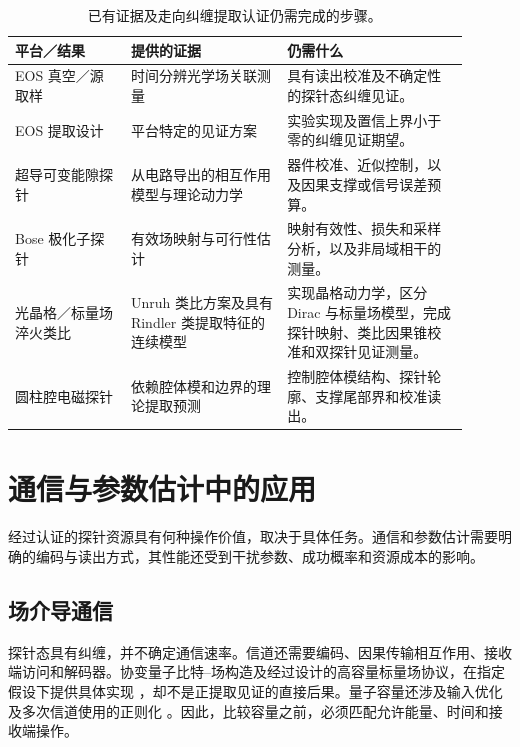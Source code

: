 \documentclass[UTF8,11pt,a4paper,fontset=none]{ctexart}
\begin{document}
\begin{table}[htbp]
\centering\small
\caption{已有证据及走向纠缠提取认证仍需完成的步骤。}
\label{tab:platform-evidence}
\begin{tabular}{p{0.23\linewidth}p{0.31\linewidth}p{0.36\linewidth}}
\toprule
平台／结果 & 提供的证据 & 仍需什么\\
\midrule
EOS 真空／源取样 \cite{Herter2026VacuumSource} & 时间分辨光学场关联测量 & 具有读出校准及不确定性的探针态纠缠见证。\\
EOS 提取设计 \cite{Lindel2024} & 平台特定的见证方案 & 实验实现及置信上界小于零的纠缠见证期望。\\
超导可变能隙探针 \cite{TeixidoBonfill2026} & 从电路导出的相互作用模型与理论动力学 & 器件校准、近似控制，以及因果支撑或信号误差预算。\\
Bose 极化子探针 \cite{PercheGozzini2026} & 有效场映射与可行性估计 & 映射有效性、损失和采样分析，以及非局域相干的测量。\\
光晶格／标量场淬火类比 \cite{RodriguezLaguna2017,KosiorLewensteinCeli2018,Louko2018RindlerQuench,LopezRavenMannLouko2025} & Unruh 类比方案及具有 Rindler 类提取特征的连续模型 & 实现晶格动力学，区分 Dirac 与标量场模型，完成探针映射、类比因果锥校准和双探针见证测量。\\
圆柱腔电磁探针 \cite{StrohleMomcilovic2026} & 依赖腔体模和边界的理论提取预测 & 控制腔体模结构、探针轮廓、支撑尾部界和校准读出。\\
\bottomrule
\end{tabular}
\end{table}

\section{通信与参数估计中的应用}
\label{sec:utility}
经过认证的探针资源具有何种操作价值，取决于具体任务。通信和参数估计需要明确的编码与读出方式，其性能还受到干扰参数、成功概率和资源成本的影响。

\subsection{场介导通信}
\label{sec:communication}
探针态具有纠缠，并不确定通信速率。信道还需要编码、因果传输相互作用、接收端访问和解码器。协变量子比特--场构造及经过设计的高容量标量场协议，在指定假设下提供具体实现 \cite{Kasprzak2025,Simidzija2020}，却不是正提取见证的直接后果。量子容量还涉及输入优化及多次信道使用的正则化 \cite{Lloyd1997,Devetak2005}。因此，比较容量之前，必须匹配允许能量、时间和接收端操作。
\end{document}
